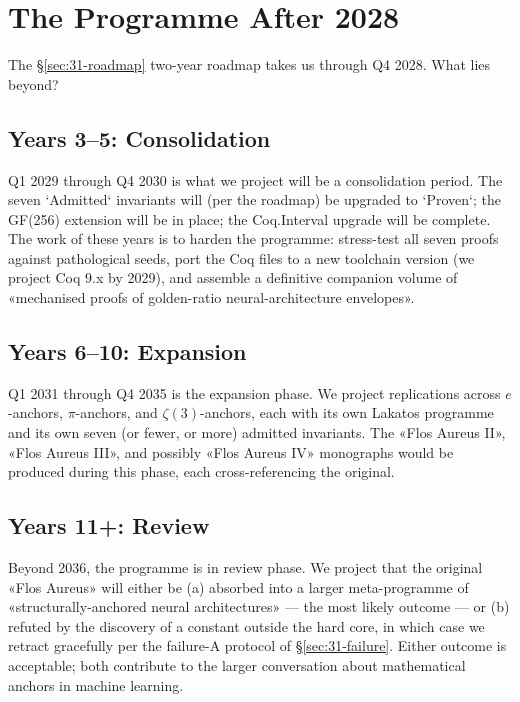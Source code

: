 \section{The Programme After 2028}
\label{sec:31-after-2028}

The §\ref{sec:31-roadmap} two-year roadmap takes us through Q4 2028. What lies beyond?

\subsection{Years 3–5: Consolidation}
\label{sec:31-years-3-5}

Q1 2029 through Q4 2030 is what we project will be a consolidation period. The seven `Admitted` invariants will (per the roadmap) be upgraded to `Proven`; the GF(256) extension will be in place; the Coq.Interval upgrade will be complete. The work of these years is to harden the programme: stress-test all seven proofs against pathological seeds, port the Coq files to a new toolchain version (we project Coq 9.x by 2029), and assemble a definitive companion volume of «mechanised proofs of golden-ratio neural-architecture envelopes».

\subsection{Years 6–10: Expansion}
\label{sec:31-years-6-10}

Q1 2031 through Q4 2035 is the expansion phase. We project replications across $e$-anchors, $\pi$-anchors, and $\zeta(3)$-anchors, each with its own Lakatos programme and its own seven (or fewer, or more) admitted invariants. The «Flos Aureus II», «Flos Aureus III», and possibly «Flos Aureus IV» monographs would be produced during this phase, each cross-referencing the original.

\subsection{Years 11+: Review}
\label{sec:31-years-11-plus}

Beyond 2036, the programme is in review phase. We project that the original «Flos Aureus» will either be (a) absorbed into a larger meta-programme of «structurally-anchored neural architectures» — the most likely outcome — or (b) refuted by the discovery of a constant outside the hard core, in which case we retract gracefully per the failure-A protocol of §\ref{sec:31-failure}. Either outcome is acceptable; both contribute to the larger conversation about mathematical anchors in machine learning.

